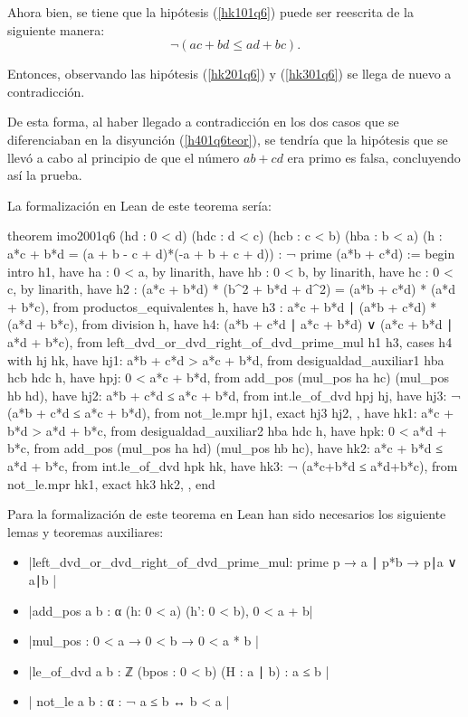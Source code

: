\begin{demostracion}
\begin{itemize}
    Ahora bien, se tiene que la hipótesis (\ref{hk101q6}) puede ser
    reescrita de la siguiente manera:
    \begin{equation}\tag{hk3}\label{hk301q6}
      ¬(ac+bd≤ad+bc).
    \end{equation}

    Entonces, observando las hipótesis (\ref{hk201q6}) y (\ref{hk301q6}) se
    llega de nuevo a contradicción.
  \end{itemize}

  De esta forma, al haber llegado a contradicción en los dos casos que se
  diferenciaban en la disyunción (\ref{h401q6teor}), se tendría que la
  hipótesis que se llevó a cabo al principio de que el número \(ab+cd\) era
  primo es falsa, concluyendo así la prueba.
\end{demostracion}

La formalización en Lean de este teorema sería:
\begin{leancode}
theorem imo2001q6
  (hd  : 0 < d)
  (hdc : d < c)
  (hcb : c < b)
  (hba : b < a)
  (h : a*c + b*d = (a + b - c + d)*(-a + b + c + d))
  : ¬ prime (a*b + c*d) :=
begin
  intro h1,
  have ha : 0 < a,
    by linarith,
  have hb : 0 < b,
    by linarith,
  have hc : 0 < c,
    by linarith,
  have h2 : (a*c + b*d) * (b^2 + b*d + d^2) =
            (a*b + c*d) * (a*d + b*c),
    from productos_equivalentes h,
  have h3 : a*c + b*d ∣ (a*b + c*d) * (a*d + b*c),
    from division h,
  have h4: (a*b + c*d ∣ a*c + b*d) ∨ (a*c + b*d  ∣ a*d + b*c),
    from left_dvd_or_dvd_right_of_dvd_prime_mul h1 h3,
  cases h4 with hj hk,
  { have hj1: a*b + c*d > a*c + b*d,
      from desigualdad_auxiliar1 hba hcb hdc h,
    have hpj: 0 < a*c + b*d,
      from add_pos (mul_pos ha hc) (mul_pos hb hd),
    have hj2: a*b + c*d ≤ a*c + b*d,
      from int.le_of_dvd hpj hj,
    have hj3: ¬ (a*b + c*d ≤ a*c + b*d),
      from not_le.mpr hj1,
    exact hj3 hj2, },
  { have hk1: a*c + b*d > a*d + b*c,
      from desigualdad_auxiliar2 hba hdc h,
    have hpk: 0 < a*d + b*c,
      from add_pos (mul_pos ha hd) (mul_pos hb hc),
    have hk2: a*c + b*d ≤ a*d + b*c,
      from int.le_of_dvd hpk hk,
    have hk3: ¬ (a*c+b*d ≤  a*d+b*c),
      from not_le.mpr hk1,
    exact hk3 hk2, },
end
\end{leancode}

Para la formalización de este teorema en Lean han sido necesarios los
siguiente lemas y teoremas auxiliares:
\begin{itemize}
\item {}|left_dvd_or_dvd_right_of_dvd_prime_mul: prime p → a ∣ p*b → p∣a ∨ a∣b |
\item {}|add_pos {a b : α} (h: 0 < a) (h': 0 < b), 0 < a + b|
\item {}|mul_pos : 0 < a → 0 < b → 0 < a * b |
\item {}|le_of_dvd {a b : ℤ} (bpos : 0 < b) (H : a ∣ b) : a ≤ b  |
\item {}| not_le {a b : α} : ¬ a ≤ b ↔ b < a |
\end{itemize}

